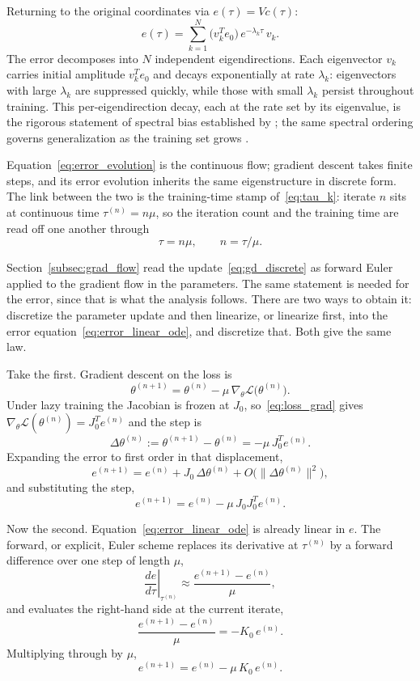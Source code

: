 Returning to the original coordinates via $e(\tau) = Vc(\tau)$:
\begin{equation}\label{eq:error_evolution}
    e(\tau) = \sum_{k=1}^{N} \bigl(v_k^T e_0\bigr)\,e^{-\lambda_k\tau}\,v_k.
\end{equation}
The error decomposes into $N$ independent eigendirections. Each eigenvector $v_k$ carries initial amplitude $v_k^T e_0$ and decays exponentially at rate $\lambda_k$: eigenvectors with large $\lambda_k$ are suppressed quickly, while those with small $\lambda_k$ persist throughout training. This per-eigendirection decay, each at the rate set by its eigenvalue, is the rigorous statement of spectral bias established by \textcite{cao2019}; the same spectral ordering governs generalization as the training set grows \parencite{bordelon2020}.

Equation~\eqref{eq:error_evolution} is the continuous flow; gradient descent takes finite steps, and its error evolution inherits the same eigenstructure in discrete form. The link between the two is the training-time stamp of~\eqref{eq:tau_k}: iterate $n$ sits at continuous time $\tau^{(n)} = n\mu$, so the iteration count and the training time are read off one another through
\begin{equation*}
    \tau = n\mu, \qquad n = \tau/\mu.
\end{equation*}

Section~\ref{subsec:grad_flow} read the update~\eqref{eq:gd_discrete} as forward Euler applied to the gradient flow in the parameters. The same statement is needed for the error, since that is what the analysis follows. There are two ways to obtain it: discretize the parameter update and then linearize, or linearize first, into the error equation~\eqref{eq:error_linear_ode}, and discretize that. Both give the same law.

Take the first. Gradient descent on the loss is
\[
    \theta^{(n+1)} = \theta^{(n)} - \mu\,\nabla_\theta\mathcal{L}\bigl(\theta^{(n)}\bigr).
\]
Under lazy training the Jacobian is frozen at $J_0$, so~\eqref{eq:loss_grad} gives $\nabla_\theta\mathcal{L}(\theta^{(n)}) = J_0^T e^{(n)}$ and the step is
\[
    \Delta\theta^{(n)} := \theta^{(n+1)} - \theta^{(n)} = -\mu\,J_0^T e^{(n)}.
\]
Expanding the error to first order in that displacement,
\[
    e^{(n+1)} = e^{(n)} + J_0\,\Delta\theta^{(n)} + O\bigl(\|\Delta\theta^{(n)}\|^2\bigr),
\]
and substituting the step,
\[
    e^{(n+1)} = e^{(n)} - \mu\,J_0 J_0^T e^{(n)}.
\]

Now the second. Equation~\eqref{eq:error_linear_ode} is already linear in $e$. The forward, or explicit, Euler scheme \parencite{suli2003, leveque2007} replaces its derivative at $\tau^{(n)}$ by a forward difference over one step of length $\mu$,
\[
    \left.\frac{de}{d\tau}\right|_{\tau^{(n)}} \approx \frac{e^{(n+1)} - e^{(n)}}{\mu},
\]
and evaluates the right-hand side at the current iterate,
\[
    \frac{e^{(n+1)} - e^{(n)}}{\mu} = -K_0\,e^{(n)}.
\]
Multiplying through by $\mu$,
\[
    e^{(n+1)} = e^{(n)} - \mu\,K_0\,e^{(n)}.
\]

